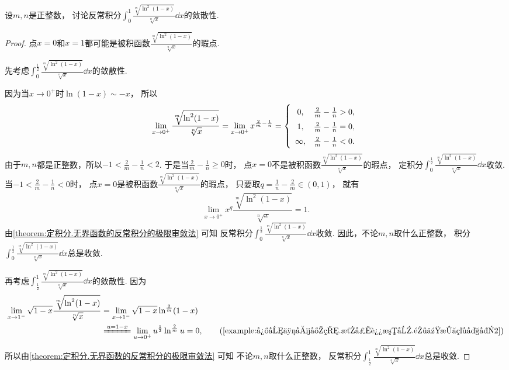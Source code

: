 \begin{example}
设\(m,n\)是正整数，
讨论反常积分\(\int_0^1 \frac{\sqrt[m]{\ln^2(1-x)}}{\sqrt[n]{x}} \dd{x}\)的敛散性.
\begin{proof}
点\(x=0\)和\(x=1\)都可能是被积函数\(\frac{\sqrt[m]{\ln^2(1-x)}}{\sqrt[n]{x}}\)的瑕点.

先考虑\(\int_0^{\frac12} \frac{\sqrt[m]{\ln^2(1-x)}}{\sqrt[n]{x}} \dd{x}\)的敛散性.

因为当\(x\to0^+\)时\(\ln(1-x) \sim -x\)，
所以\[
	\lim_{x\to0^+} \frac{\sqrt[m]{\ln^2(1-x)}}{\sqrt[n]{x}}
	= \lim_{x\to0^+} x^{\frac2m-\frac1n}
	= \left\{ \def\arraystretch{1.5} \begin{array}{cl}
		0, & \frac2m-\frac1n>0, \\
		1, & \frac2m-\frac1n=0, \\
		\infty, & \frac2m-\frac1n<0.
	\end{array} \right.
\]
由于\(m,n\)都是正整数，所以\(-1<\frac2m-\frac1n<2\).
于是当\(\frac2m-\frac1n\geq0\)时，
点\(x=0\)不是被积函数\(\frac{\sqrt[m]{\ln^2(1-x)}}{\sqrt[n]{x}}\)的瑕点，
定积分\(\int_0^{\frac12} \frac{\sqrt[m]{\ln^2(1-x)}}{\sqrt[n]{x}} \dd{x}\)收敛.
当\(-1<\frac2m-\frac1n<0\)时，
点\(x=0\)是被积函数\(\frac{\sqrt[m]{\ln^2(1-x)}}{\sqrt[n]{x}}\)的瑕点，
只要取\(q=\frac1n-\frac2m\in(0,1)\)，
就有\[
	\lim_{x\to0^+} x^q \frac{\sqrt[m]{\ln^2(1-x)}}{\sqrt[n]{x}} = 1.
\]
由\cref{theorem:定积分.无界函数的反常积分的极限审敛法} 可知
反常积分\(\int_0^{\frac12} \frac{\sqrt[m]{\ln^2(1-x)}}{\sqrt[n]{x}} \dd{x}\)收敛.
因此，不论\(m,n\)取什么正整数，
积分\(\int_0^{\frac12} \frac{\sqrt[m]{\ln^2(1-x)}}{\sqrt[n]{x}} \dd{x}\)总是收敛.

再考虑\(\int_{\frac12}^1 \frac{\sqrt[m]{\ln^2(1-x)}}{\sqrt[n]{x}} \dd{x}\)的敛散性.
因为\begin{align*}
	\lim_{x\to1^-} \sqrt{1-x} \frac{\sqrt[m]{\ln^2(1-x)}}{\sqrt[n]{x}}
	&= \lim_{x\to1^-} \sqrt{1-x} \ln^{\frac2m}(1-x) \\
	&\xlongequal{u=1-x}
	\lim_{u\to0^+} u^{\frac12} \ln^{\frac2m} u
	= 0, \tag{\cref{example:微分中值定理.洛必达法则.零乘无穷大型2}}
\end{align*}
所以由\cref{theorem:定积分.无界函数的反常积分的极限审敛法} 可知
不论\(m,n\)取什么正整数，
反常积分\(\int_{\frac12}^1 \frac{\sqrt[m]{\ln^2(1-x)}}{\sqrt[n]{x}} \dd{x}\)总是收敛.
\end{proof}
\end{example}
